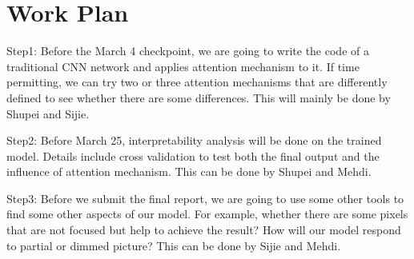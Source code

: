 \documentclass[12pt]{article}
\begin{document}
\section{Work Plan}

Step1: Before the March 4 checkpoint, we are going to write the code of a traditional CNN network and applies attention mechanism to it. 
If time permitting, we can try two or three attention mechanisms that are differently defined to see whether there are some differences. 
This will mainly be done by Shupei and Sijie.

Step2: Before March 25, interpretability analysis will be done on the trained model. Details include cross validation to test both the final output and the influence of attention mechanism. 
This can be done by Shupei and Mehdi.

Step3: Before we submit the final report, we are going to use some other tools to find some other aspects of our model. 
For example, whether there are some pixels that are not focused but help to achieve the result? How will our model respond to partial or dimmed picture? This can be done by Sijie and Mehdi.

\newpage



\end{document}
